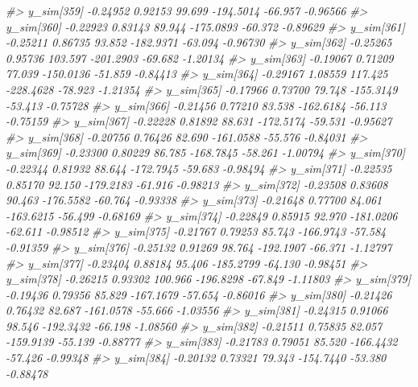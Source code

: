 \documentclass[
  10pt,
  italian,
  a4paper,
  extrafontsizes,onecolumn,openright
  ]{memoir}
\newenvironment{Shaded}{\begin{snugshade}}{\end{snugshade}}
\newcommand{\CommentTok}[1]{\textcolor[rgb]{0.56,0.35,0.01}{\textit{#1}}}
\begin{document}
\begin{Shaded}
\begin{Highlighting}[]
\CommentTok{\#\textgreater{} y\_sim[359] {-}0.24952 0.92153  99.699 {-}194.5014 {-}66.957 {-}0.96566}
\CommentTok{\#\textgreater{} y\_sim[360] {-}0.22923 0.83143  89.944 {-}175.0893 {-}60.372 {-}0.89629}
\CommentTok{\#\textgreater{} y\_sim[361] {-}0.25211 0.86735  93.852 {-}182.9371 {-}63.094 {-}0.96730}
\CommentTok{\#\textgreater{} y\_sim[362] {-}0.25265 0.95736 103.597 {-}201.2903 {-}69.682 {-}1.20134}
\CommentTok{\#\textgreater{} y\_sim[363] {-}0.19067 0.71209  77.039 {-}150.0136 {-}51.859 {-}0.84413}
\CommentTok{\#\textgreater{} y\_sim[364] {-}0.29167 1.08559 117.425 {-}228.4628 {-}78.923 {-}1.21354}
\CommentTok{\#\textgreater{} y\_sim[365] {-}0.17966 0.73700  79.748 {-}155.3149 {-}53.413 {-}0.75728}
\CommentTok{\#\textgreater{} y\_sim[366] {-}0.21456 0.77210  83.538 {-}162.6184 {-}56.113 {-}0.75159}
\CommentTok{\#\textgreater{} y\_sim[367] {-}0.22228 0.81892  88.631 {-}172.5174 {-}59.531 {-}0.95627}
\CommentTok{\#\textgreater{} y\_sim[368] {-}0.20756 0.76426  82.690 {-}161.0588 {-}55.576 {-}0.84031}
\CommentTok{\#\textgreater{} y\_sim[369] {-}0.23300 0.80229  86.785 {-}168.7845 {-}58.261 {-}1.00794}
\CommentTok{\#\textgreater{} y\_sim[370] {-}0.22344 0.81932  88.644 {-}172.7945 {-}59.683 {-}0.98494}
\CommentTok{\#\textgreater{} y\_sim[371] {-}0.22535 0.85170  92.150 {-}179.2183 {-}61.916 {-}0.98213}
\CommentTok{\#\textgreater{} y\_sim[372] {-}0.23508 0.83608  90.463 {-}176.5582 {-}60.764 {-}0.93338}
\CommentTok{\#\textgreater{} y\_sim[373] {-}0.21648 0.77700  84.061 {-}163.6215 {-}56.499 {-}0.68169}
\CommentTok{\#\textgreater{} y\_sim[374] {-}0.22849 0.85915  92.970 {-}181.0206 {-}62.611 {-}0.98512}
\CommentTok{\#\textgreater{} y\_sim[375] {-}0.21767 0.79253  85.743 {-}166.9743 {-}57.584 {-}0.91359}
\CommentTok{\#\textgreater{} y\_sim[376] {-}0.25132 0.91269  98.764 {-}192.1907 {-}66.371 {-}1.12797}
\CommentTok{\#\textgreater{} y\_sim[377] {-}0.23404 0.88184  95.406 {-}185.2799 {-}64.130 {-}0.98451}
\CommentTok{\#\textgreater{} y\_sim[378] {-}0.26215 0.93302 100.966 {-}196.8298 {-}67.849 {-}1.11803}
\CommentTok{\#\textgreater{} y\_sim[379] {-}0.19436 0.79356  85.829 {-}167.1679 {-}57.654 {-}0.86016}
\CommentTok{\#\textgreater{} y\_sim[380] {-}0.21426 0.76432  82.687 {-}161.0578 {-}55.666 {-}1.03556}
\CommentTok{\#\textgreater{} y\_sim[381] {-}0.24315 0.91066  98.546 {-}192.3432 {-}66.198 {-}1.08560}
\CommentTok{\#\textgreater{} y\_sim[382] {-}0.21511 0.75835  82.057 {-}159.9139 {-}55.139 {-}0.88777}
\CommentTok{\#\textgreater{} y\_sim[383] {-}0.21783 0.79051  85.520 {-}166.4432 {-}57.426 {-}0.99348}
\CommentTok{\#\textgreater{} y\_sim[384] {-}0.20132 0.73321  79.343 {-}154.7440 {-}53.380 {-}0.88478}

\end{Highlighting}
\end{Shaded}
\end{document}
